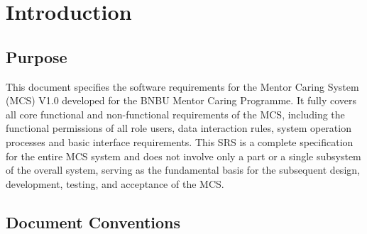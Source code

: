 \section{Introduction}

\subsection{Purpose}

This document specifies the software requirements for the Mentor Caring System (MCS) V1.0 developed for the BNBU Mentor Caring Programme. It fully covers all core functional and non-functional requirements of the MCS, including the functional permissions of all role users, data interaction rules, system operation processes and basic interface requirements. This SRS is a complete specification for the entire MCS system and does not involve only a part or a single subsystem of the overall system, serving as the fundamental basis for the subsequent design, development, testing, and acceptance of the MCS.

\subsection{Document Conventions}

